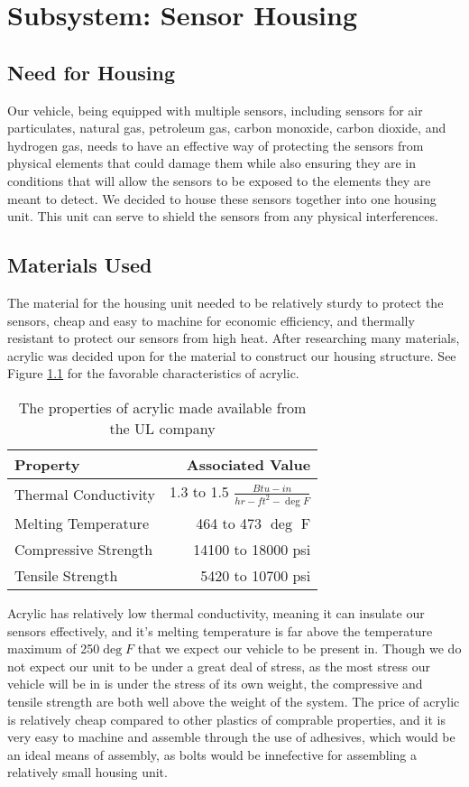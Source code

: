 \chapter{Subsystem: Sensor Housing}

\section{Need for Housing} Our vehicle, being equipped with multiple sensors, including sensors for air particulates, natural gas, petroleum gas, carbon monoxide, carbon dioxide, and hydrogen gas, needs to have an effective way of protecting the sensors from physical elements that could damage them while also ensuring they are in conditions that will allow the sensors to be exposed to the elements they are meant to detect. We decided to house these sensors together into one housing unit. This unit can serve to shield the sensors from any physical interferences.

\section{Materials Used} The material for the housing unit needed to be relatively sturdy to protect the sensors, cheap and easy to machine for economic efficiency, and thermally resistant to protect our sensors from high heat. After researching many materials, acrylic was decided upon for the material to construct our housing structure. See Figure \ref{tab:Acrylic Properties} for the favorable characteristics of acrylic. 

\begin{table}
\centering
\begin{tabular}{l|r}
Property & Associated Value \\\hline
Thermal Conductivity & 1.3 to 1.5 $\frac{Btu-in}{hr-ft^2-\deg F}$ \\
Melting Temperature & 464 to 473 $\deg$ F \\
Compressive Strength & 14100 to 18000 psi \\
Tensile Strength & 5420 to 10700 psi \\
\end{tabular}
\caption{\label{tab:Acrylic Properties} The properties of acrylic made available from the UL company \cite{UL}}
\end{table}

Acrylic has relatively low thermal conductivity, meaning it can insulate our sensors effectively, and it's melting temperature is far above the temperature maximum of 250$\deg F$ that we expect our vehicle to be present in. Though we do not expect our unit to be under a great deal of stress, as the most stress our vehicle will be in is under the stress of its own weight, the compressive and tensile strength are both well above the weight of the system. The price of acrylic is relatively cheap compared to other plastics of comprable properties, and it is very easy to machine and assemble through the use of adhesives, which would be an ideal means of assembly, as bolts would be innefective for assembling a relatively small housing unit.

